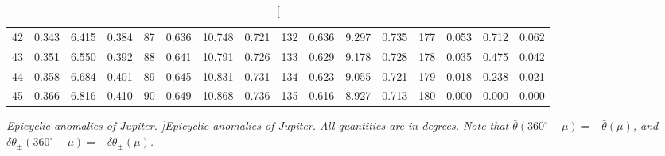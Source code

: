 \begin{table}
{\begin{tabular}{rrrr|rrrr|rrrr|rrrr}
 42 & \tiny{  0.343} &   6.415 & \tiny{  0.384} &  87 & \tiny{  0.636} &  10.748 & \tiny{  0.721} & 132 & \tiny{  0.636} &   9.297 & \tiny{  0.735} & 177 & \tiny{  0.053} &   0.712 & \tiny{  0.062}\\
 43 & \tiny{  0.351} &   6.550 & \tiny{  0.392} &  88 & \tiny{  0.641} &  10.791 & \tiny{  0.726} & 133 & \tiny{  0.629} &   9.178 & \tiny{  0.728} & 178 & \tiny{  0.035} &   0.475 & \tiny{  0.042}\\
 44 & \tiny{  0.358} &   6.684 & \tiny{  0.401} &  89 & \tiny{  0.645} &  10.831 & \tiny{  0.731} & 134 & \tiny{  0.623} &   9.055 & \tiny{  0.721} & 179 & \tiny{  0.018} &   0.238 & \tiny{  0.021}\\
 45 & \tiny{  0.366} &   6.816 & \tiny{  0.410} &  90 & \tiny{  0.649} &  10.868 & \tiny{  0.736} & 135 & \tiny{  0.616} &   8.927 & \tiny{  0.713} & 180 & \tiny{  0.000} &   0.000 & \tiny{  0.000}\\
\end{tabular}}
\caption[\em  Epicyclic anomalies of Jupiter. ]{\em Epicyclic anomalies of Jupiter. All quantities are in degrees. Note that $\bar{\theta}(360^\circ-\mu) = -\bar{\theta}(\mu)$, and $\delta\theta_{\pm}(360^\circ-\mu) = -\delta\theta_{\pm}(\mu)$. }\label{vt13}
\end{table}

